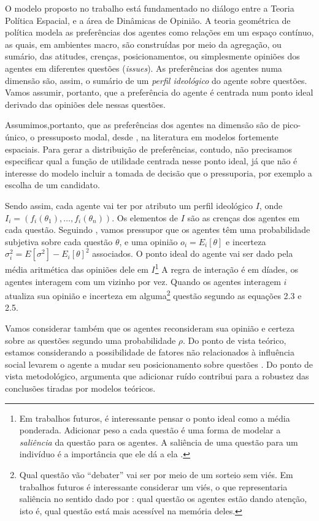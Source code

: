 O modelo proposto no trabalho está fundamentado no diálogo entre a Teoria
Política Espacial, e a área de Dinâmicas de Opinião. A teoria geométrica de
política modela as preferências dos agentes como relações em um espaço contínuo,
as quais, em ambientes macro, são construídas por meio da agregação, ou sumário,
das atitudes, crenças, posicionamentos, ou simplesmente opiniões dos agentes em
diferentes questões (\textit{issues}). As preferências dos agentes numa dimensão
são, assim, o sumário de um \textit{perfil ideológico} do agente sobre questões.
Vamos assumir, portanto, que a preferência do agente é centrada num ponto ideal
derivado das opiniões dele nessas questões.

Assumimos,portanto, que as preferências dos agentes na dimensão são de
pico-único, o pressuposto modal, desde , na
literatura em modelos fortemente espaciais. Para gerar a distribuição de
preferências, contudo, não precisamos especificar qual a função de utilidade
centrada nesse ponto ideal, já que não é interesse do modelo incluir a tomada de
decisão que o pressuporia, por exemplo a escolha de um candidato.

Sendo assim, cada agente vai ter por atributo um perfil ideológico \(I\), onde
\(I_i = (f_i(\theta_1), \ldots, f_i(\theta_n)) \). Os elementos de \(I\) são as crenças dos
agentes em cada questão. Seguindo , vamos pressupor
que os agentes têm uma probabilidade subjetiva sobre cada questão \(\theta\), e uma
opinião \( o_i = E_i[\theta]\) e incerteza \( \sigma_i^2 = E[\sigma^2] - E_ i[\theta]^2\)
associados. O ponto ideal do agente vai ser dado pela média aritmética das
opiniões dele em \(I\)\footnote{Em trabalhos futuros, é interessante pensar o
  ponto ideal como a média ponderada. Adicionar peso a cada questão é uma forma
  de modelar a \textit{saliência} da questão para os agentes. A saliência de uma
  questão para um indivíduo é a importância que ele dá a ela
  \cite{munger2015choosing}.} A regra de interação é em díades, os agentes
interagem com um vizinho por vez. Quando os agentes interagem \(i\) atualiza sua
opinião e incerteza em alguma\footnote{Qual questão vão ``debater'' vai ser por
  meio de um sorteio sem viés. Em trabalhos futuros é interessante considerar um
  viés, o que representaria saliência no sentido dado por
  : qual questão os agentes estão dando atenção,
  isto é, qual questão está mais acessível na memória deles.} questão segundo as
equações 2.3 e 2.5.

Vamos considerar também que os agentes reconsideram sua opinião e certeza sobre
as questões segundo uma probabilidade \(\rho\). Do ponto de vista teórico, estamos
considerando a possibilidade de fatores não relacionados à influência social
levarem o agente a mudar seu posicionamento sobre questões \cite{flache2017,
  lorenz2017modeling}. Do ponto de vista metodológico, \cite{macy2015signal}
argumenta que adicionar ruído contribui para a robustez das conclusões tiradas
por modelos teóricos.





